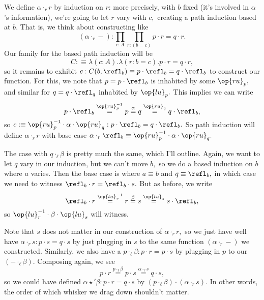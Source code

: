 We define $\alpha\cdot_rr$ by induction on $r$: more precisely, with $b$ fixed (it's involved in $\alpha$'s information), we're going to let $r$ vary with $c,$ creating a path induction based at $b.$ That is, we think about constructing like
\[(\alpha\cdot_r-):\prod_{c:A}\prod_{r:(b=c)}p\cdot r=q\cdot r.\]
Our family for the based path induction will be
\[C:\equiv\lambda(c:A).\lambda(r:b=c).p\cdot r=q\cdot r,\]
so it remains to exhibit $c:C(b,\refl_b)\equiv p\cdot\refl_b=q\cdot\refl_b$ to construct our function. For this, we note that $p=p\cdot\refl_b$ is inhabited by some $\op{ru}_p,$ and similar for $q=q\cdot\refl_q$ inhabited by $\op{lu}_p.$ This implies we can write
\[p\cdot\refl_b\stackrel{\op{ru}_p^{-1}}=p\stackrel\alpha=q\stackrel{\op{ru}_q}=q\cdot\refl_b,\]
so $c:\equiv\op{ru}_p^{-1}\cdot\alpha\cdot\op{ru}_q:p\cdot\refl_b=q\cdot\refl_b.$ So path induction will define $\alpha\cdot_rr$ with base case $\alpha\cdot_r\refl_b\equiv\op{ru}_p^{-1}\cdot\alpha\cdot\op{ru}_q.$

The case with $q\cdot_\ell\beta$ is pretty much the same, which I'll outline. Again, we want to let $q$ vary in our induction, but we can't move $b,$ so we do a based induction on $b$ where $a$ varies. Then the base case is where $a\equiv b$ and $q\equiv\refl_b,$ in which case we need to witness $\refl_b\cdot r=\refl_b\cdot s.$ But as before, we write
\[\refl_b\cdot r\stackrel{\op{lu}_r^{-1}}=r\stackrel\beta=s\stackrel{\op{lu}_s}=s\cdot\refl_b,\]
so $\op{lu}_r^{-1}\cdot\beta\cdot\op{lu}_s$ will witness.

Note that $s$ does not matter in our construction of $\alpha\cdot_rr,$ so we just have well have $\alpha\cdot_rs:p\cdot s=q\cdot s$ by just plugging in $s$ to the same function $(\alpha\cdot_r-)$ we constructed. Similarly, we also have a $p\cdot_\ell\beta:p\cdot r=p\cdot s$ by plugging in $p$ to our $(-\cdot_\ell\beta).$ Composing again, we see
\[p\cdot r\stackrel{p\cdot_\ell\beta}=p\cdot s\stackrel{\alpha\cdot_rs}=q\cdot s,\]
so we could have defined $\alpha\star'\beta:p\cdot r=q\cdot s$ by $(p\cdot_\ell\beta)\cdot(\alpha\cdot_rs).$ In other words, the order of which whisker we drag down shouldn't matter.

